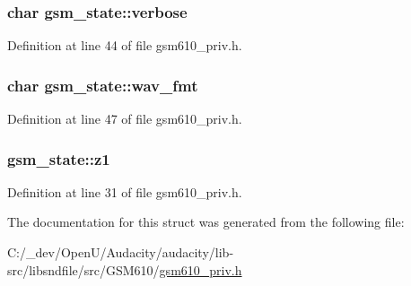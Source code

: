 \subsubsection[{\texorpdfstring{verbose}{verbose}}]{\setlength{\rightskip}{0pt plus 5cm}char gsm\+\_\+state\+::verbose}\hypertarget{structgsm__state_afa9095ba58ae3a64fc7e592a2ca71ec3}{}\label{structgsm__state_afa9095ba58ae3a64fc7e592a2ca71ec3}


Definition at line 44 of file gsm610\+\_\+priv.\+h.

\subsubsection[{\texorpdfstring{wav\+\_\+fmt}{wav_fmt}}]{\setlength{\rightskip}{0pt plus 5cm}char gsm\+\_\+state\+::wav\+\_\+fmt}\hypertarget{structgsm__state_ade641730743150dfb543b789e1a1b85f}{}\label{structgsm__state_ade641730743150dfb543b789e1a1b85f}


Definition at line 47 of file gsm610\+\_\+priv.\+h.

\subsubsection[{\texorpdfstring{z1}{z1}}]{ gsm\+\_\+state\+::z1}\hypertarget{structgsm__state_aa893fbc493fffa33f0fc19950647cfa6}{}\label{structgsm__state_aa893fbc493fffa33f0fc19950647cfa6}


Definition at line 31 of file gsm610\+\_\+priv.\+h.



The documentation for this struct was generated from the following file\+:\begin{DoxyCompactItemize}
\item 
C\+:/\+\_\+dev/\+Open\+U/\+Audacity/audacity/lib-\/src/libsndfile/src/\+G\+S\+M610/\hyperlink{gsm610__priv_8h}{gsm610\+\_\+priv.\+h}\end{DoxyCompactItemize}
